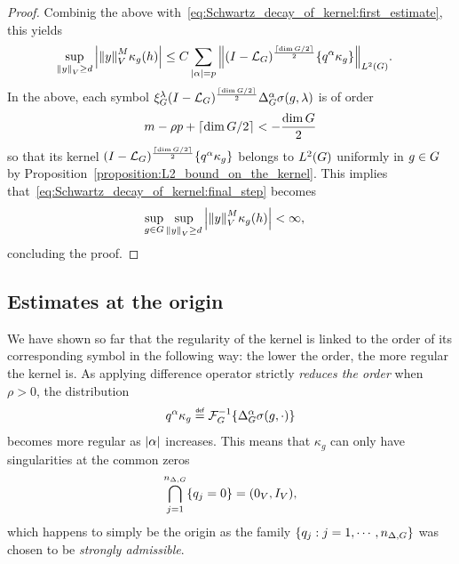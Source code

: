 \begin{proof}
    Combinig the above with~\eqref{eq:Schwartz_decay_of_kernel:first_estimate},
    this yields
    \begin{align}
        \sup_{\norm y \geq d} &\abs{\norm y^M \kappa_g(h)}
        \leq C \sum_{\abs \alpha = p} \norm [\Lebesgue 2 \Group] {\BesselPotential {\Ceiling {\dim \Group / 2}} \{q^\alpha \kappa_g\}}.
        \label{eq:Schwartz_decay_of_kernel:final_step}
    \end{align}
    In the above,
    each symbol $\xi^{\lambda}_{G} (I - {\mathcal{L}_{G}})^\frac{\lceil\dim G / 2\rceil}{2} {\Delta_{G}^{\alpha}} \sigma(g, \lambda)$ is of order
    \begin{align*}
        m - \rho p + \lceil\dim G / 2\rceil < -\frac {\dim G} 2
    \end{align*}
    so that its kernel $(I - {\mathcal{L}_{G}})^\frac{\lceil\dim G / 2\rceil}{2} \{q^\alpha \kappa_g\}$ belongs to ${L^{2} (G)}$ uniformly in $g \in G$ by Proposition~\ref{proposition:L2_bound_on_the_kernel}.
    This implies that~\eqref{eq:Schwartz_decay_of_kernel:final_step} becomes
    \begin{align*}
        \sup_{g \in G} \sup_{{\left\| y \right\|}_{V} \geq d} &\left|{{\left\| y \right\|}_{V}^M \kappa_g(h)}\right| < \infty,
    \end{align*}
    concluding the proof.
\end{proof}

\subsection{Estimates at the origin}

We have shown so far that the regularity of the kernel is linked to the order of its corresponding symbol in the following way:
the lower the order, the more regular the kernel is.
As applying difference operator strictly \emph{reduces the order} when $\rho > 0$,
the distribution
\begin{align*}
    q^\alpha \kappa_g \defeq \InverseFourier \{ \DifferenceOperatorOrder \alpha \sigma(g, \dummy) \}
\end{align*}
becomes more regular as $\left|{\alpha}\right|$ increases.
This means that $\kappa_g$ can only have singularities at the common zeros
\begin{align*}
    \bigcap_{j = 1}^{n_{\Delta, G}} \{ q_j = 0 \} = (0_V, {I_{V}}),
\end{align*}
which happens to simply be the origin
as the family $\{q_j : j = 1, \cdots, n_{\Delta, G}\}$ was chosen to be \emph{strongly admissible}.

